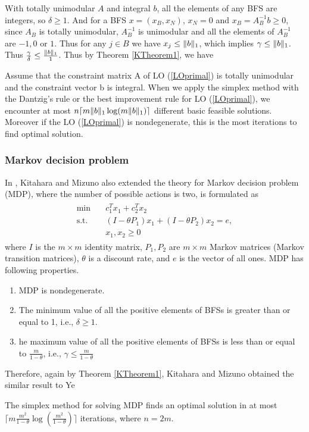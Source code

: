 \documentclass[11pt]{article}
\begin{document}
With totally unimodular $A$ and integral $b$, all the elements of any BFS are integers, so $\delta \ge 1$. And for a BFS $x = (x_B, x_N)$, $x_N = 0$ and $x_B = A_B^{-1}b \ge 0$, since $A_B$ is totally unimodular, $A_B^{-1}$ is unimodular \cite{kitahara2013bound} and all the elements of $A_B^{-1}$ are $-1, 0$ or $1$. Thus for any $j \in B$ we have $x_j \le \lVert b\rVert_1$, which implies $\gamma \le \lVert b\rVert_1$. Thus $\frac{\gamma}{\delta} \le \frac{\lVert b\rVert_1}{1}$. Thus by Theorem \ref{KTheorem1}, we have
\begin{corollary}
Assume that the constraint matrix A of LO (\ref{LOprimal}) is totally unimodular and the constraint vector b is integral. When we apply the simplex method with the Dantzig's rule or the best improvement rule for LO (\ref{LOprimal}), we encounter at most $n\lceil m \lVert b\rVert_1\log(m\lVert b\rVert_1)\rceil$ different basic feasible solutions. Moreover if the LO (\ref{LOprimal}) is nondegenerate, this is the most iterations to find optimal solution. 
\end{corollary}

\subsubsection{Markov decision problem}
In \cite{kitahara2013bound}, Kitahara and Mizuno also extended the theory for Markov decision problem (MDP), where the number of possible actions is two, is formulated as
\begin{align}
\begin{split}
\min \quad &c_1^Tx_1 + c_2^Tx_2 \\
\text{s.t. } \quad &(I-\theta P_1)x_1 + (I - \theta P_2)x_2 = e, \\
&x_1, x_2 \ge 0
\end{split}
\end{align}
where $I$ is the $m \times m$ identity matrix, $P_1, P_2$ are $m\times m$ Markov matrices (Markov transition matrices), $\theta$ is a discount rate, and $e$ is the vector of all ones. MDP has following properties.
\begin{enumerate}
\item MDP is nondegenerate.
\item The minimum value of all the positive elements of BFSs is greater than or equal to 1, i.e., $\delta \ge 1$.
\item he maximum value of all the positive elements of BFSs is less than or equal to $\frac{m}{1-\theta}$, i.e., $\gamma \le \frac{m}{1-\theta}$
\end{enumerate}
Therefore, again by Theorem \ref{KTheorem1}, Kitahara and Mizuno \cite{kitahara2013bound} obtained the similar result to Ye \cite{ye2010simplex}
\begin{corollary}
 The simplex method for solving MDP finds an optimal solution in at most $\lceil m \frac{m^2}{1-\theta}\log(\frac{m^2}{1-\theta})\rceil$ iterations, where $n=2m$.
\end{corollary}
\end{document}
